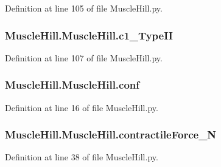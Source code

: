 Definition at line 105 of file Muscle\+Hill.\+py.

\subsubsection[{\texorpdfstring{c1\+\_\+\+Type\+II}{c1_TypeII}}]{\setlength{\rightskip}{0pt plus 5cm}Muscle\+Hill.\+Muscle\+Hill.\+c1\+\_\+\+Type\+II}\hypertarget{class_muscle_hill_1_1_muscle_hill_aa191f691eede884be74a2e5db86da504}{}\label{class_muscle_hill_1_1_muscle_hill_aa191f691eede884be74a2e5db86da504}


Definition at line 107 of file Muscle\+Hill.\+py.

\subsubsection[{\texorpdfstring{conf}{conf}}]{\setlength{\rightskip}{0pt plus 5cm}Muscle\+Hill.\+Muscle\+Hill.\+conf}\hypertarget{class_muscle_hill_1_1_muscle_hill_a081599e4b3b4faf450f8c09e654ea188}{}\label{class_muscle_hill_1_1_muscle_hill_a081599e4b3b4faf450f8c09e654ea188}


Definition at line 16 of file Muscle\+Hill.\+py.

\subsubsection[{\texorpdfstring{contractile\+Force\+\_\+N}{contractileForce_N}}]{\setlength{\rightskip}{0pt plus 5cm}Muscle\+Hill.\+Muscle\+Hill.\+contractile\+Force\+\_\+N}\hypertarget{class_muscle_hill_1_1_muscle_hill_a8a1d022609680dff9b3efae94eba8f38}{}\label{class_muscle_hill_1_1_muscle_hill_a8a1d022609680dff9b3efae94eba8f38}


Definition at line 38 of file Muscle\+Hill.\+py.

